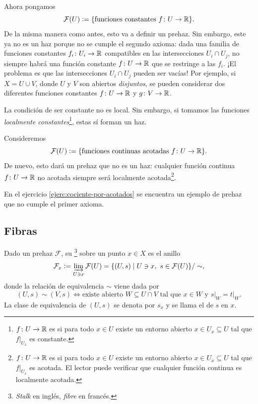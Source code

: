 \documentclass{article}
\numberwithin{equation}{section}
\theoremstyle{definition}
\begin{document}
\begin{ejemplo}
  Ahora pongamos
  $$\mathcal{F} (U) \mathrel{\mathop:}= \{ \text{funciones constantes } f\colon U\to \mathbb{R} \}.$$
  De la misma manera como antes, esto va a definir un prehaz. Sin embargo, este
  ya no es un haz porque no se cumple el segundo axioma: dada una familia de
  funciones constantes $f_i\colon U_i \to \mathbb{R}$ compatibles en las intersecciones
  $U_i \cap U_j$, no siempre habrá una función constante $f\colon U\to \mathbb{R}$ que
  se restringe a las $f_i$. ¡El problema es que las intersecciones
  $U_i \cap U_j$ pueden ser vacías! Por ejemplo, si $X = U \cup V$, donde $U$ y
  $V$ son abiertos \emph{disjuntos}, se pueden considerar dos diferentes
  funciones constantes $f\colon U\to \mathbb{R}$ y $g\colon V\to \mathbb{R}$.

  La condición de ser constante no es local. Sin embargo, si tomamos las
  funciones \emph{localmente constantes}\footnote{$f\colon U\to \mathbb{R}$ es
     si para todo $x\in U$ existe un entorno abierto
    $x \in U_x \subseteq U$ tal que $\left.f\right|_{U_x}$ es constante.}, estas
  sí forman un haz.
\end{ejemplo}

\begin{ejemplo}
  \label{ejemplo:prehaz-de-funciones-acotadas}
  Consideremos
  $$\mathcal{F} (U) \mathrel{\mathop:}= \{ \text{funciones continuas acotadas } f\colon U\to \mathbb{R} \}.$$
  De nuevo, esto dará un prehaz que no es un haz: cualquier función continua
  $f\colon U\to \mathbb{R}$ no acotada siempre será localmente
  acotada\footnote{$f\colon U\to \mathbb{R}$ es  si para todo
    $x\in U$ existe un entorno abierto $x \in U_x \subseteq U$ tal que
    $\left.f\right|_{U_x}$ es acotada. El lector puede verificar que cualquier
    función continua es localmente acotada.}.
\end{ejemplo}

En el ejercicio \ref{ejerc:cociente-por-acotados} se encuentra un ejemplo de
prehaz que no cumple el primer axioma.

\subsection{Fibras}

\begin{definicion}
  \label{dfn:fibras}
  Dado un prehaz $\mathcal{F}$, su \footnote{\emph{Stalk} en inglés,
    \emph{fibre} en francés.} sobre un punto $x \in X$ es el anillo
  \[ \mathcal{F}_x \mathrel{\mathop:}= \varinjlim_{U\ni x} \mathcal{F} (U) =
     \{ (U,s) \mid U\ni x, ~ s \in \mathcal{F} (U) \}/\sim, \]
  donde la relación de equivalencia $\sim$ viene dada por
  \[ (U,s) \sim (V,s) \iff
     \text{existe abierto } W \subseteq U\cap V
     \text{ tal que }
     x \in W \text{ y }\left.s\right|_W = \left.t\right|_W. \]
   La clase de equivalencia de $(U,s)$ se denota por $s_x$ y se llama
   el  de $s$ en $x$.
\end{definicion}
\end{document}
